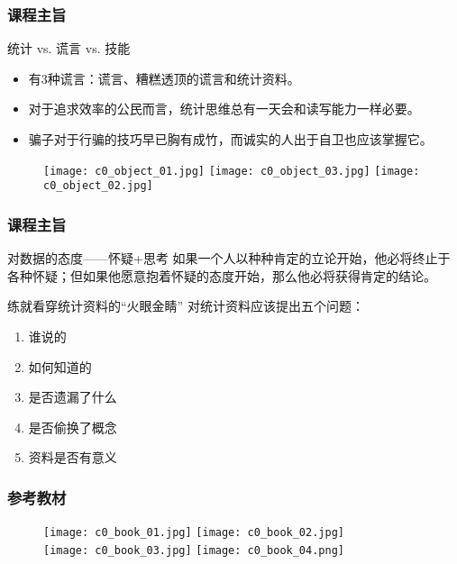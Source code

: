\begin{frame}[fragile]
  \frametitle{课程主旨}
  \begin{block}{统计 vs. 谎言 vs. 技能}
    \begin{itemize}
      \item 有3种谎言：谎言、糟糕透顶的谎言和统计资料。
      \item 对于追求效率的公民而言，统计思维总有一天会和读写能力一样必要。
      \item 骗子对于行骗的技巧早已胸有成竹，而诚实的人出于自卫也应该掌握它。
    \end{itemize}
  \end{block}
  \pause
  \vspace{-0.5em}
  \begin{figure}
    \centering
    \texttt{[image: c0\_object\_01.jpg]}
    \texttt{[image: c0\_object\_03.jpg]}
    \texttt{[image: c0\_object\_02.jpg]}
  \end{figure}
\end{frame}

\begin{frame}
  \frametitle{课程主旨}
  \begin{block}{对数据的态度——怀疑+思考}
    如果一个人以种种肯定的立论开始，他必将终止于各种怀疑；但如果他愿意抱着怀疑的态度开始，那么他必将获得肯定的结论。
  \end{block}
  \pause
  \begin{block}{练就看穿统计资料的“火眼金睛”}
    对统计资料应该提出五个问题：
    \begin{enumerate}
      \item 谁说的
      \item 如何知道的
      \item 是否遗漏了什么
      \item 是否偷换了概念
      \item 资料是否有意义
    \end{enumerate}
  \end{block}
\end{frame}

\begin{frame}
  \frametitle{参考教材}
  \begin{figure}
    \centering
    \texttt{[image: c0\_book\_01.jpg]}\qquad
    \texttt{[image: c0\_book\_02.jpg]}\\
    \texttt{[image: c0\_book\_03.jpg]}\qquad
    \texttt{[image: c0\_book\_04.png]}
  \end{figure}
\end{frame}

